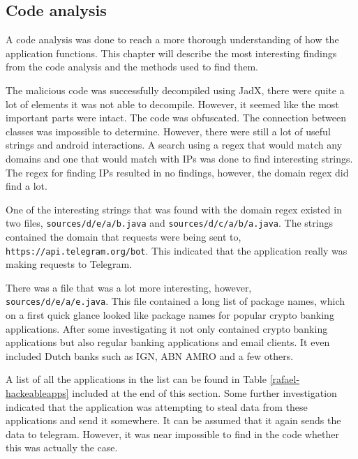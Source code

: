 \subsection{Code analysis}

A code analysis was done to reach a more thorough understanding of how the application functions.
This chapter will describe the most interesting findings from the code analysis and the methods used to find them.

The malicious code was successfully decompiled using JadX, there were quite a lot of elements it was not able to decompile.
However, it seemed like the most important parts were intact. 
The code was obfuscated. The connection between classes was impossible to determine.
However, there were still a lot of useful strings and android interactions.
A search using a regex that would match any domains and one that would match with IPs was done to find interesting strings.
The regex for finding IPs resulted in no findings, however, the domain regex did find a lot.

One of the interesting strings that was found with the domain regex existed in two files, \texttt{sources/d/e/a/b.java} and \texttt{sources/d/c/a/b/a.java}.
The strings contained the domain that requests were being sent to, \texttt{https://api.telegram.org/bot}.
This indicated that the application really was making requests to Telegram.

There was a file that was a lot more interesting, however, \texttt{sources/d/e/a/e.java}.
This file contained a long list of package names, which on a first quick glance looked like package names for popular crypto banking applications.
After some investigating it not only contained crypto banking applications but also regular banking applications and email clients.
It even included Dutch banks such as IGN, ABN AMRO and a few others. 

A list of all the applications in the list can be found in Table \ref{rafael-hackeableapps} included at the end of this section.
Some further investigation indicated that the application was attempting to steal data from these applications and send it somewhere.
It can be assumed that it again sends the data to telegram. However, it was near impossible to find in the code whether this was actually the case.

\newpage
